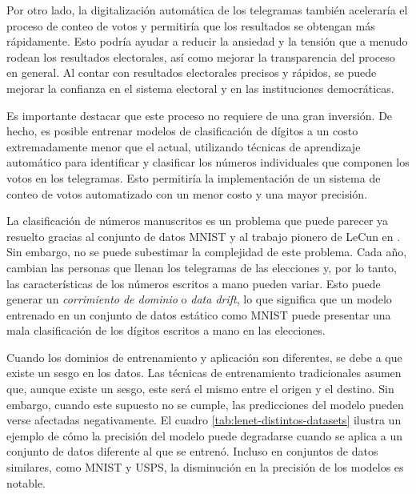 Por otro lado, la digitalización automática de los telegramas también aceleraría el proceso de conteo de votos y
permitiría que los resultados se obtengan más rápidamente. Esto podría ayudar a reducir la ansiedad y la tensión que a
menudo rodean los resultados electorales, así como mejorar la transparencia del proceso en general. Al contar con
resultados electorales precisos y rápidos, se puede mejorar la confianza en el sistema electoral y en las instituciones
democráticas.

Es importante destacar que este proceso no requiere de una gran inversión. De hecho, es posible entrenar modelos de
clasificación de dígitos a un costo extremadamente menor que el actual, utilizando técnicas de aprendizaje automático
para identificar y clasificar los números individuales que componen los votos en los telegramas. Esto permitiría la
implementación de un sistema de conteo de votos automatizado con un menor costo y una mayor precisión.

La clasificación de números manuscritos es un problema que puede parecer ya resuelto gracias al conjunto de datos MNIST
y al trabajo pionero de LeCun en \citeyear{lecun1998gradient}. Sin embargo, no se puede subestimar la complejidad de
este problema. Cada año, cambian las personas que llenan los telegramas de las elecciones y, por lo tanto, las
características de los números escritos a mano pueden variar. Esto puede generar un {\it corrimiento de dominio} o {\it
        data drift}, lo que significa que un modelo entrenado en un conjunto de datos estático como MNIST puede presentar una
mala clasificación de los dígitos escritos a mano en las elecciones.

Cuando los dominios de entrenamiento y aplicación son diferentes, se debe a que existe un sesgo en los datos. Las
técnicas de entrenamiento tradicionales asumen que, aunque existe un sesgo, este será el mismo entre el origen y el
destino. Sin embargo, cuando este supuesto no se cumple, las predicciones del modelo pueden verse afectadas
negativamente. El cuadro \ref{tab:lenet-distintos-datasets} ilustra un ejemplo de cómo la precisión del modelo puede
degradarse cuando se aplica a un conjunto de datos diferente al que se entrenó. Incluso en conjuntos de datos
similares, como MNIST y USPS, la disminución en la precisión de los modelos es notable.


